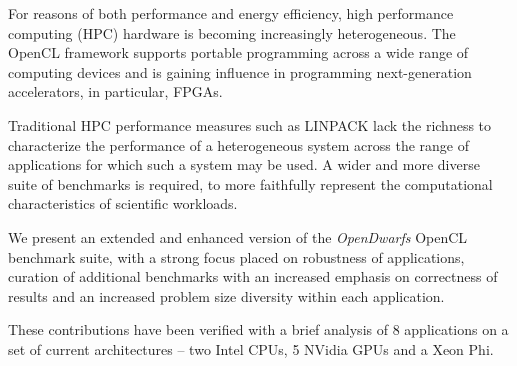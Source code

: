 \documentclass[../document.tex]{subfiles}
\begin{document}
For reasons of both performance and energy efficiency, high performance computing (HPC) hardware is becoming increasingly heterogeneous.
The OpenCL framework supports portable programming across a wide range of computing devices and is gaining influence in programming next-generation accelerators, in particular, FPGAs.

Traditional HPC performance measures such as LINPACK lack the richness to characterize the performance of a heterogeneous system across the range of applications for which such a system may be used.
A wider and more diverse suite of benchmarks is required, to more faithfully  represent the computational characteristics of scientific workloads.

We present an extended and enhanced version of the \emph{OpenDwarfs} OpenCL benchmark suite, with a strong focus placed on robustness of applications, curation of additional benchmarks with an increased emphasis on correctness of results and an increased problem size diversity within each application.

These contributions have been verified with a brief analysis of 8 applications on a set of current architectures -- two Intel CPUs, 5 NVidia GPUs and a Xeon Phi.



\end{document}
